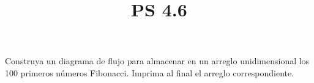 \documentclass[11pt]{amsart}
\title{PS 4.6}
\begin{document}
\maketitle
\noindent Construya un diagrama de flujo para almacenar en un arreglo unidimensional los
100 primeros números Fibonacci. Imprima al final el arreglo correspondiente.
\end{document}

